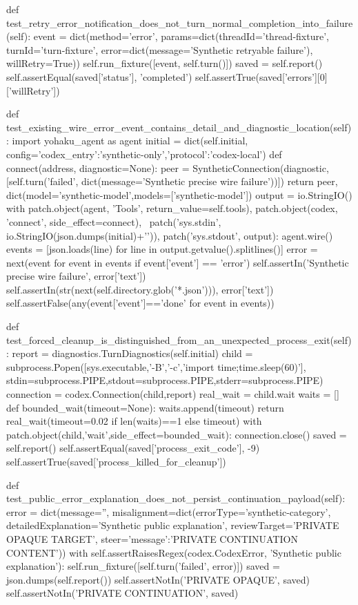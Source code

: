     def test_retry_error_notification_does_not_turn_normal_completion_into_failure(self):
        event = dict(method='error', params=dict(threadId='thread-fixture', turnId='turn-fixture',
                     error=dict(message='Synthetic retryable failure'), willRetry=True))
        self.run_fixture([event, self.turn()])
        saved = self.report()
        self.assertEqual(saved['status'], 'completed')
        self.assertTrue(saved['errors'][0]['willRetry'])

    def test_existing_wire_error_event_contains_detail_and_diagnostic_location(self):
        import yohaku_agent as agent
        initial = dict(self.initial, config={'codex_entry':'synthetic-only','protocol':'codex-local'})
        def connect(address, diagnostic=None):
            peer = SyntheticConnection(diagnostic, [self.turn('failed', dict(message='Synthetic precise wire failure'))])
            return peer, dict(model='synthetic-model',models=['synthetic-model'])
        output = io.StringIO()
        with patch.object(agent, 'Tools', return_value=self.tools), patch.object(codex, 'connect', side_effect=connect), \
             patch('sys.stdin', io.StringIO(json.dumps(initial)+'\n')), patch('sys.stdout', output):
            agent.wire()
        events = [json.loads(line) for line in output.getvalue().splitlines()]
        error = next(event for event in events if event['event'] == 'error')
        self.assertIn('Synthetic precise wire failure', error['text'])
        self.assertIn(str(next(self.directory.glob('*.json'))), error['text'])
        self.assertFalse(any(event['event']=='done' for event in events))

    def test_forced_cleanup_is_distinguished_from_an_unexpected_process_exit(self):
        report = diagnostics.TurnDiagnostics(self.initial)
        child = subprocess.Popen([sys.executable,'-B','-c','import time;time.sleep(60)'],
                                 stdin=subprocess.PIPE,stdout=subprocess.PIPE,stderr=subprocess.PIPE)
        connection = codex.Connection(child,report)
        real_wait = child.wait
        waits = []
        def bounded_wait(timeout=None):
            waits.append(timeout)
            return real_wait(timeout=0.02 if len(waits)==1 else timeout)
        with patch.object(child,'wait',side_effect=bounded_wait):
            connection.close()
        saved = self.report()
        self.assertEqual(saved['process_exit_code'], -9)
        self.assertTrue(saved['process_killed_for_cleanup'])

    def test_public_error_explanation_does_not_persist_continuation_payload(self):
        error = dict(message='', misalignment=dict(errorType='synthetic-category',
                     detailedExplanation='Synthetic public explanation', reviewTarget='PRIVATE OPAQUE TARGET',
                     steer={'message':'PRIVATE CONTINUATION CONTENT'}))
        with self.assertRaisesRegex(codex.CodexError, 'Synthetic public explanation'):
            self.run_fixture([self.turn('failed', error)])
        saved = json.dumps(self.report())
        self.assertNotIn('PRIVATE OPAQUE', saved)
        self.assertNotIn('PRIVATE CONTINUATION', saved)


